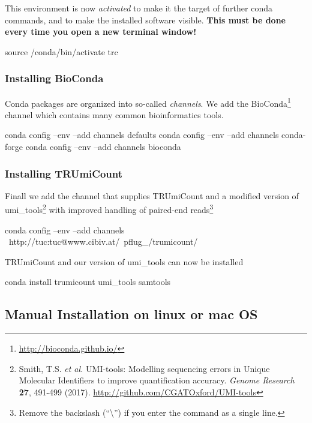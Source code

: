 \documentclass[10pt]{article}
\begin{document}
This environment is now \emph{activated} to make it the target of further conda commands, and to make the installed software visible. \textbf{This must be done every time you open a new terminal window!}

\begin{shellcode}
source /conda/bin/activate trc
\end{shellcode}
\subsubsection*{Installing BioConda}

Conda packages are organized into so-called \emph{channels}. We add the BioConda\footnote{\url{http://bioconda.github.io/}} channel which contains many common bioinformatics tools.

\begin{shellcode}
conda config --env --add channels defaults
conda config --env --add channels conda-forge
conda config --env --add channels bioconda
\end{shellcode}

\subsubsection*{Installing TRUmiCount}

Finall we add the channel that supplies TRUmiCount and a modified version of umi\_tools\footnote{Smith, T.S. \textit{et al.} UMI-tools: Modelling sequencing errors in Unique Molecular Identifiers to improve quantification accuracy. \textit{Genome Research} \textbf{27}, 491-499 (2017). \url{http://github.com/CGATOxford/UMI-tools}} with improved handling of paired-end reads\footnote{Remove the backslash (``\textbackslash'') if you enter the command as a single line.}

\begin{shellcode}
conda config --env --add channels \
  http://tuc:tuc@www.cibiv.at/~pflug_/trumicount/
\end{shellcode}

TRUmiCount and our version of umi\_tools can now be installed

\begin{shellcode}
conda install trumicount umi_tools samtools
\end{shellcode}

\pagebreak
\subsection{Manual Installation on linux or mac OS}
\end{document}
